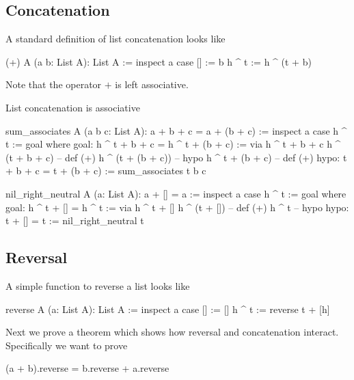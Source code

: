 \subsection{Concatenation}


A standard definition of list concatenation looks like

\begin{alba}
  (+) A (a b: List A): List A :=
    inspect a case
      [] :=
        b
      h ^ t :=
        h ^ (t + b)
\end{alba}
Note that the operator $+$ is left associative.


List concatenation is associative
%
\begin{alba}
  sum_associates A (a b c: List A): a + b + c = a + (b + c) :=
    inspect a case
      h ^ t :=
        goal where
          goal: h ^ t + b + c = h ^ t + (b + c) :=
            via
               h ^ t + b + c
               h ^ (t + b + c)      -- def (+)
               h ^ (t + (b + c))    -- hypo
               h ^ t + (b + c)      -- def (+)
          hypo: t + b + c = t + (b + c) :=
            sum_associates t b c
\end{alba}


\begin{alba}
  nil_right_neutral A (a: List A): a + [] = a :=
    inspect a case
      h ^ t :=
        goal where
          goal: h ^ t + [] = h ^ t :=
            via
              h ^ t + []
              h ^ (t + [])   -- def (+)
              h ^ t          -- hypo
          hypo: t + [] = t :=
            nil_right_neutral t
\end{alba}





\subsection{Reversal}



A simple function to reverse a list looks like

\begin{alba}
  reverse A (a: List A): List A :=
    inspect a case
      [] :=
        []
      h ^ t :=
        reverse t + [h]
\end{alba}


Next we prove a theorem which shows how reversal and concatenation
interact. Specifically we want to prove
\begin{alba}
  (a + b).reverse = b.reverse + a.reverse
\end{alba}


